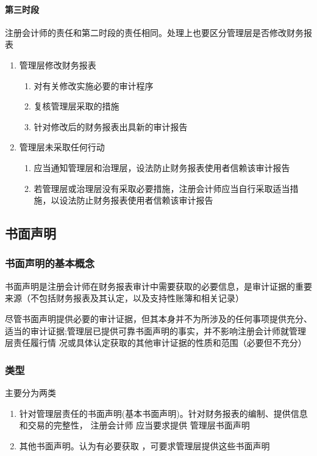 \documentclass[UTF8,12pt]{ctexart}
\numberwithin{equation}{section} %
\numberwithin{figure}{section}
\numberwithin{table}{section}
\begin{document}
	\paragraph{第三时段}
	注册会计师的责任和第二时段的责任相同。处理上也要区分管理层是否修改财务报表
	\begin{enumerate}
		\item 管理层修改财务报表
		\begin{enumerate}
			\item 对有关修改实施必要的审计程序
			
			\item 复核管理层采取的措施
			
			\item 针对修改后的财务报表出具新的审计报告
		\end{enumerate}
		
		\item 管理层未采取任何行动
		\begin{enumerate}
			\item 应当通知管理层和治理层，设法防止财务报表使用者信赖该审计报告
			
			\item 若管理层或治理层没有采取必要措施，注册会计师应当自行采取适当措施，以设法防止财务报表使用者信赖该审计报告
		\end{enumerate}
	\end{enumerate}
	
	\subsection{书面声明}
	
	\subsubsection{书面声明的基本概念}
	书面声明是注册会计师在财务报表审计中需要获取的必要信息，是审计证据的重要来源（不包括财务报表及其认定，以及支持性账簿和相关记录）
	
	尽管书面声明提供必要的审计证据，但其本身并不为所涉及的任何事项提供充分、适当的审计证据;管理层已提供可靠书面声明的事实，并不影响注册会计师就管理层责任履行情 况或具体认定获取的其他审计证据的性质和范围（必要但不充分）
	
	\subsubsection{类型}
	主要分为两类
	\begin{enumerate}
		\item 针对管理层责任的书面声明(基本书面声明)。针对财务报表的编制、提供信息和交易的完整性， 注册会计师  应当要求提供  管理层书面声明
		
		\item 其他书面声明。认为有必要获取  ，可要求管理层提供这些书面声明
	\end{enumerate}
	
\end{document}
